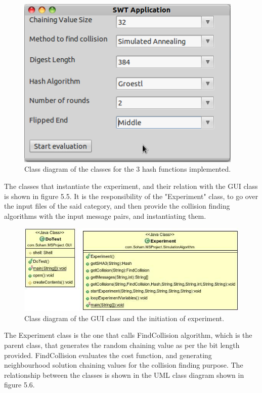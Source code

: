\begin{figure}
  \begin{center}
    \includegraphics[width=4.25in]{experimentscreenshot.png}
  \end{center}
  \caption{Class diagram of the classes for the 3 hash functions implemented.}
  \label{fig:experimentscreenshot}
\end{figure}

The classes that instantiate the experiment, and their relation with the GUI class is shown in figure 5.5. It is 
the responsibility of the "Experiment" class, to go over the input files of the said category, and then provide 
the collision finding algorithms with the input message pairs, and instantiating them.

\begin{figure}
  \begin{center}
    \includegraphics[width=5.65in]{ExperimentGUIClass.jpg}
  \end{center}
  \caption{Class diagram of the GUI class and the initiation of experiment.}
  \label{fig:UMLExperimentGUIClass}
\end{figure}

The Experiment class is the one that calls FindCollision algorithm, which is the parent class, that generates
the random chaining value as per the bit length provided. FindCollision evaluates the cost function, and generating
neighbourhood solution chaining values for the collision finding purpose. The relationship between the classes 
is shown in the UML class diagram shown in figure 5.6.

